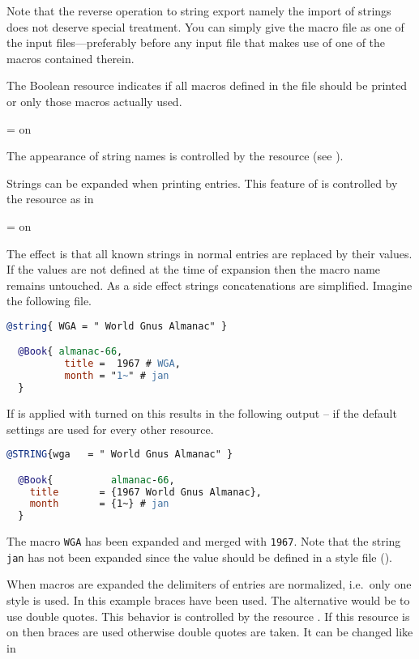 \documentclass[11pt,a4paper]{scrbook}
\begin{document}
Note that the reverse operation to string export namely the import of strings
does not deserve special treatment. You can simply give the macro file as one
of the input files---preferably before any input file that makes use of one of
the macros contained therein.

The Boolean resource  indicates if all macros defined
in the \BibTeX{} file should be printed or only those macros actually used.

\begin{Resources}
   = on
\end{Resources}

The appearance of string names is controlled by the resource 
(see \pageref{symbol.type}).

Strings can be expanded when printing entries. This feature of \BibTool{} is
controlled by the resource  as in

\begin{Resources}
   = on
\end{Resources}

The effect is that all known strings in normal entries are replaced by their
values. If the values are not defined at the time of expansion then the macro
name remains untouched. As a side effect strings concatenations are
simplified. Imagine the following \BibTeX{} file.

\begin{lstlisting}[language=BibTeX]
  @string{ WGA = " World Gnus Almanac" }

  @Book{ almanac-66,
          title =  1967 # WGA,
          month = "1~" # jan
  }
\end{lstlisting}

If \BibTool{} is applied with  turned on this results in
the following output -- if the default settings are used for every other
resource.
\begin{lstlisting}[language=BibTeX]
  @STRING{wga   = " World Gnus Almanac" }

  @Book{          almanac-66,
    title       = {1967 World Gnus Almanac},
    month       = {1~} # jan
  }
\end{lstlisting}
The macro \texttt{WGA} has been expanded and merged with \verb|1967|. Note
that the string \verb|jan| has not been expanded since the value should be
defined in a \BibTeX{} style file ().

When macros are expanded the delimiters of entries are normalized, i.e.\ only
one style is used. In this example braces have been used. The alternative
would be to use double quotes. This behavior is controlled by the resource
. If this resource is on then braces are used otherwise
double quotes are taken. It can be changed like in
\end{document}
